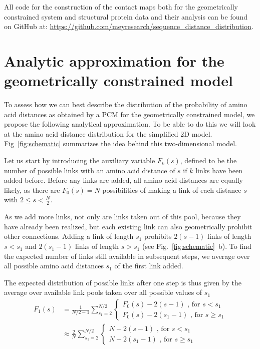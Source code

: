 \documentclass[
reprint,
twocolumn,
amsmath,amssymb,superscriptaddress,aps,
pre]{revtex4-1}
\newcommand{\red}[1]{\textcolor{red!80!black}{#1}}
\begin{document}
All code for the construction of the contact maps both for the geometrically constrained system and structural protein data and their analysis can be found on GitHub at: \url{https://github.com/meyresearch/sequence_distance_distribution}.


\section{Analytic approximation for the geometrically constrained model}

To assess how we can best describe the distribution of the probability of amino acid distances as obtained by a PCM for the geometrically constrained model, we propose the following analytical approximation. To be able to do this we will look at the amino acid distance distribution for the simplified 2D model. Fig~\ref{fig:schematic} summarizes the idea behind this two-dimensional model.

Let us start by introducing the auxiliary variable $F_k(s)$, defined to be the number of possible links with an amino acid distance of $s$ if $k$ links have been added before. Before any links are added, all amino acid distances are equally likely, as there are $F_0(s)=N$ possibilities of making a link of each distance $s$ with $2\leq s < \frac{N}{2}$.

As we add more links, not only are links taken out of this pool, because they have already been realized, \red{but} each existing link can also geometrically prohibit other connections. Adding a link of length $s_1$ prohibits $2(s-1)$ links of length $s<s_1$ and $2(s_1-1)$ links of length $s>s_1$ (see Fig.~\ref{fig:schematic}~b). To find the expected number of links still available in subsequent steps, we average over all possible amino acid distances $s_1$ of the first link added.

The expected distribution of possible links after one step is \red{thus given} by the average over available link pools taken over all possible values of $s_1$
\begin{equation}
\begin{aligned}
    F_1(s)&=\frac{1}{N/2-1} \sum_{s_1=2}^{N/2}{ \begin{cases}
    F_0(s)-2(s-1) \text{ , for } s<s_1\\
    F_0(s)-2(s_1 -1)\text{ , for } s\geq s_1
    \end{cases}}
    \nonumber \\
    &\approx\frac{2}{N} \sum_{s_1=2}^{N/2} { \begin{cases}
    N-2(s-1) \text{ , for } s<s_1\\
    N-2(s_1 -1)\text{ , for } s\geq s_1
    \end{cases}}
\end{aligned}
    \label{eq:reduction_first_step}
\end{equation}
\end{document}
